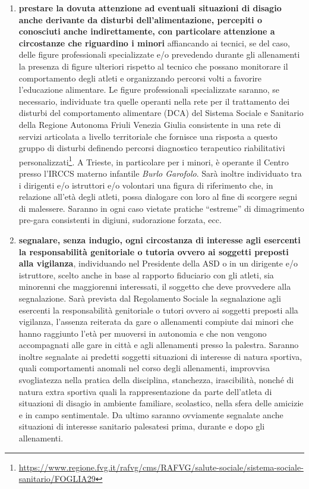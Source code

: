 \documentclass{djtsasddoc}
\begin{document}
\begin{enumerate}
\begin{enumerate}
			\item \textbf{prestare la dovuta attenzione ad eventuali situazioni di disagio anche derivante da disturbi dell'alimentazione, percepiti o conosciuti anche indirettamente, con particolare attenzione a circostanze che riguardino i minori} affiancando ai tecnici, se del caso, delle figure professionali specializzate e/o prevedendo durante gli allenamenti la presenza di figure ulteriori rispetto al tecnico che possano monitorare il comportamento degli atleti e organizzando percorsi volti a favorire l'educazione alimentare. Le figure professionali specializzate saranno, se necessario, individuate tra quelle operanti nella rete per il trattamento dei disturbi del comportamento alimentare (DCA) del Sistema Sociale e Sanitario della Regione Autonoma Friuli Venezia Giulia consistente in una rete di servizi articolata a livello territoriale che fornisce una risposta a questo gruppo di disturbi definendo percorsi diagnostico terapeutico riabilitativi personalizzati\footnote{\href{https://www.regione.fvg.it/rafvg/cms/RAFVG/salute-sociale/sistema-sociale-sanitario/FOGLIA29/}{https://www.regione.fvg.it/rafvg/cms/RAFVG/salute-sociale/sistema-sociale-sanitario/FOGLIA29}}. A Trieste, in particolare per i minori, è operante il Centro presso l'IRCCS materno infantile \textit{Burlo Garofolo}. Sarà inoltre individuato tra i dirigenti e/o istruttori e/o volontari una figura di riferimento che, in relazione all'età degli atleti, possa dialogare con loro al fine di scorgere segni di malessere. Saranno in ogni caso vietate pratiche “estreme” di dimagrimento pre-gara consistenti in digiuni, sudorazione forzata, ecc.
			\item \textbf{segnalare, senza indugio, ogni circostanza di interesse agli esercenti la responsabilità genitoriale o tutoria ovvero ai soggetti preposti alla vigilanza}, individuando nel Presidente della ASD o in un dirigente e/o istruttore, scelto anche in base al rapporto fiduciario con gli atleti, sia minorenni che maggiorenni interessati, il soggetto che deve provvedere alla segnalazione. Sarà prevista dal Regolamento Sociale la segnalazione agli esercenti la responsabilità genitoriale o tutori ovvero ai soggetti preposti alla vigilanza, l'assenza reiterata da gare o allenamenti compiute dai minori che hanno raggiunto l'età per muoversi in autonomia e che non vengono accompagnati alle gare in città e agli allenamenti presso la palestra. Saranno inoltre segnalate ai predetti soggetti situazioni di interesse di natura sportiva, quali comportamenti anomali nel corso degli allenamenti, improvvisa svogliatezza nella pratica della disciplina, stanchezza, irascibilità, nonché di natura extra sportiva quali la rappresentazione da parte dell'atleta di situazioni di disagio in ambiente familiare, scolastico, nella sfera delle amicizie e in campo sentimentale. Da ultimo saranno ovviamente segnalate anche situazioni di interesse sanitario palesatesi prima, durante e dopo gli allenamenti.

\end{enumerate}
\end{enumerate}
\end{document}
